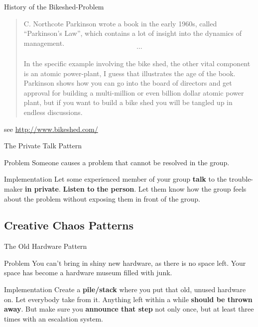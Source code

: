 \documentclass[mathserif]{beamer}
\begin{document}
\begin{frame}[plain]{History of the Bikeshed-Problem}
	\begin{quote}
		C. Northcote Parkinson wrote a book in the early 1960s, called “Parkinson's
		Law”, which contains a lot of insight into the dynamics of management.\\
		\[…\]\\
		In the specific example involving the bike shed, the other vital component
		is an atomic power-plant, I guess that illustrates the age of the book.
		Parkinson shows how you can go into the board of directors and get approval
		for building a multi-million or even billion dollar atomic power plant, but
		if you want to build a bike shed you will be tangled up in endless
		discussions.
	\end{quote}

	see \url{http://www.bikeshed.com/}
\end{frame}

\begin{frame}{The Private Talk Pattern}
	\begin{alertblock}{Problem}
		Someone causes a problem that cannot be resolved in the group.
	\end{alertblock}
	\pause
	\begin{exampleblock}{Implementation}
		Let some experienced member of your group \textbf{talk} to the trouble-maker
		\textbf{in private}.  \textbf{Listen to the person}.  Let them know how the
		group feels about the problem without exposing them in front of the group.
	\end{exampleblock}
\end{frame}


\subsection{Creative Chaos Patterns}

\begin{frame}{The Old Hardware Pattern}
	\begin{alertblock}{Problem}
		You can't bring in shiny new hardware, as there is no space left.  Your
		space has become a hardware museum filled with junk.
	\end{alertblock}
	\pause
	\begin{exampleblock}{Implementation}
		Create a \textbf{pile/stack} where you put that old, unused hardware on.
		Let everybody take from it.  Anything left within a while \textbf{should
		be thrown away}.  But make sure you \textbf{announce that step} not only
		once, but at least three times with an escalation system.
	\end{exampleblock}
\end{frame}
\end{document}
